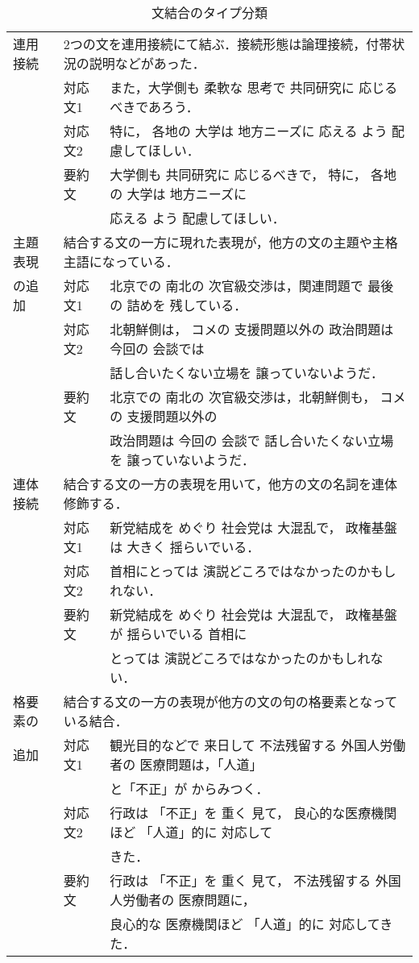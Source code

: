\begin{table}
\caption{文結合のタイプ分類} 
\label{combitype}
\begin{center}
\small
\begin{tabular}{|l|ll|}
\hline
連用接続&
 \multicolumn{2}{|l|}{2つの文を連用接続にて結ぶ．接続形態は論理接続，付帯状況の説明などがあった．} \\ \cline{2-3}
        &対応文1 & また，大学側も 柔軟な 思考で 共同研究に 応じるべきであろう．\\
        &対応文2 & 特に， 各地の 大学は 地方ニーズに 応える よう 配慮してほしい．\\
        &要約文  & 大学側も 共同研究に 応じるべきで， 特に， 各地の 大学は 地方ニーズに \\
        &        & 応える よう 配慮してほしい．\\ \hline
主題表現&
 \multicolumn{2}{|l|}{結合する文の一方に現れた表現が，他方の文の主題や主格主語になっている．}\\ \cline{2-3}
の追加  &対応文1 & 北京での 南北の 次官級交渉は，関連問題で 最後の 詰めを 残している．\\
        &対応文2 & 北朝鮮側は， コメの 支援問題以外の 政治問題は 今回の 会談では \\
        &        & 話し合いたくない立場を 譲っていないようだ．\\
        &要約文  & 北京での 南北の 次官級交渉は，北朝鮮側も， コメの 支援問題以外の \\
	&        & 政治問題は 今回の 会談で 話し合いたくない立場を 譲っていないようだ．\\ \hline
連体接続&
\multicolumn{2}{|l|}{結合する文の一方の表現を用いて，他方の文の名詞を連体修飾する．} \\ \cline{2-3}
        &対応文1 & 新党結成を めぐり 社会党は 大混乱で， 政権基盤は 大きく 揺らいでいる．\\
        &対応文2 & 首相にとっては 演説どころではなかったのかもしれない．\\
        &要約文  & 新党結成を めぐり 社会党は 大混乱で， 政権基盤が 揺らいでいる 首相に\\
        &        & とっては 演説どころではなかったのかもしれない．\\ \hline
格要素の&
\multicolumn{2}{|l|}{結合する文の一方の表現が他方の文の句の格要素となっている結合．}\\ \cline{2-3}
追加    &対応文1 & 観光目的などで 来日して 不法残留する 外国人労働者の 医療問題は，「人道」\\
        &        & と「不正」が からみつく．\\
        &対応文2 & 行政は 「不正」を 重く 見て， 良心的な医療機関ほど 「人道」的に 対応して\\
        &        &きた．\\
        &要約文  & 行政は 「不正」を 重く 見て， 不法残留する 外国人労働者の 医療問題に，\\
        &        & 良心的な 医療機関ほど 「人道」的に 対応してきた．\\ \hline
\end{tabular}
\end{center}
\end{table}


